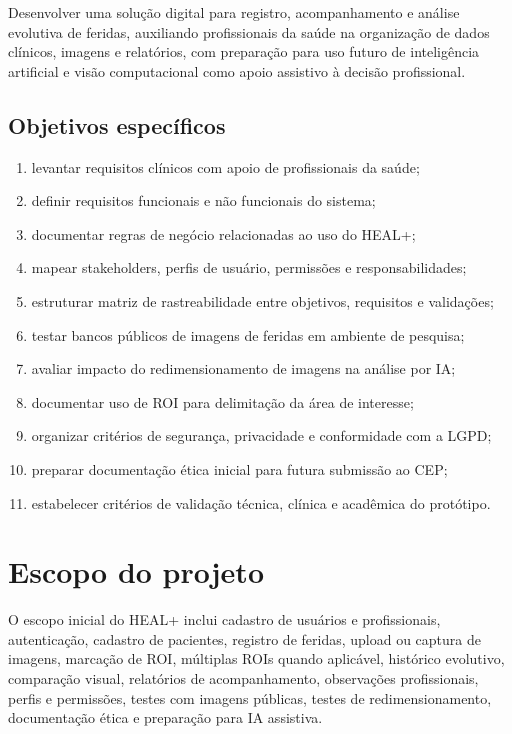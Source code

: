 \documentclass[
    12pt,
    oneside,
    a4paper,
    chapter=TITLE,
    brazil,
    sumario=tradicional,
    hidelinks
]{abntex2}
\begin{document}
Desenvolver uma solução digital para registro, acompanhamento e análise evolutiva de feridas, auxiliando profissionais da saúde na organização de dados clínicos, imagens e relatórios, com preparação para uso futuro de inteligência artificial e visão computacional como apoio assistivo à decisão profissional.

\section{Objetivos específicos}

\begin{enumerate}
    \item levantar requisitos clínicos com apoio de profissionais da saúde;
    \item definir requisitos funcionais e não funcionais do sistema;
    \item documentar regras de negócio relacionadas ao uso do HEAL+;
    \item mapear stakeholders, perfis de usuário, permissões e responsabilidades;
    \item estruturar matriz de rastreabilidade entre objetivos, requisitos e validações;
    \item testar bancos públicos de imagens de feridas em ambiente de pesquisa;
    \item avaliar impacto do redimensionamento de imagens na análise por IA;
    \item documentar uso de ROI para delimitação da área de interesse;
    \item organizar critérios de segurança, privacidade e conformidade com a LGPD;
    \item preparar documentação ética inicial para futura submissão ao CEP;
    \item estabelecer critérios de validação técnica, clínica e acadêmica do protótipo.
\end{enumerate}

\chapter{Escopo do projeto}

O escopo inicial do HEAL+ inclui cadastro de usuários e profissionais, autenticação, cadastro de pacientes, registro de feridas, upload ou captura de imagens, marcação de ROI, múltiplas ROIs quando aplicável, histórico evolutivo, comparação visual, relatórios de acompanhamento, observações profissionais, perfis e permissões, testes com imagens públicas, testes de redimensionamento, documentação ética e preparação para IA assistiva.
\end{document}
